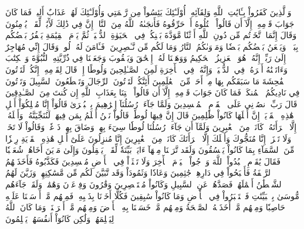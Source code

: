 وَٱلَّذِينَ كَفَرُواْ بِـَٔايَٰتِ ٱللَّهِ وَلِقَآئِهِۦٓ أُوْلَـٰٓئِكَ يَئِسُواْ مِن رَّحۡمَتِي وَأُوْلَـٰٓئِكَ لَهُمۡ عَذَابٌ أَلِيمٞ
فَمَا كَانَ جَوَابَ قَوۡمِهِۦٓ إِلَّآ أَن قَالُواْ ٱقۡتُلُوهُ أَوۡ حَرِّقُوهُ فَأَنجَىٰهُ ٱللَّهُ مِنَ ٱلنَّارِۚ إِنَّ فِي ذَٰلِكَ لَأٓيَٰتٖ لِّقَوۡمٖ يُؤۡمِنُونَ
وَقَالَ إِنَّمَا ٱتَّخَذۡتُم مِّن دُونِ ٱللَّهِ أَوۡثَٰنٗا مَّوَدَّةَ بَيۡنِكُمۡ فِي ٱلۡحَيَوٰةِ ٱلدُّنۡيَاۖ ثُمَّ يَوۡمَ ٱلۡقِيَٰمَةِ يَكۡفُرُ بَعۡضُكُم بِبَعۡضٖ وَيَلۡعَنُ بَعۡضُكُم بَعۡضٗا وَمَأۡوَىٰكُمُ ٱلنَّارُ وَمَا لَكُم مِّن نَّـٰصِرِينَ
۞فَـَٔامَنَ لَهُۥ لُوطٞۘ وَقَالَ إِنِّي مُهَاجِرٌ إِلَىٰ رَبِّيٓۖ إِنَّهُۥ هُوَ ٱلۡعَزِيزُ ٱلۡحَكِيمُ
وَوَهَبۡنَا لَهُۥٓ إِسۡحَٰقَ وَيَعۡقُوبَ وَجَعَلۡنَا فِي ذُرِّيَّتِهِ ٱلنُّبُوَّةَ وَٱلۡكِتَٰبَ وَءَاتَيۡنَٰهُ أَجۡرَهُۥ فِي ٱلدُّنۡيَاۖ وَإِنَّهُۥ فِي ٱلۡأٓخِرَةِ لَمِنَ ٱلصَّـٰلِحِينَ
وَلُوطًا إِذۡ قَالَ لِقَوۡمِهِۦٓ إِنَّكُمۡ لَتَأۡتُونَ ٱلۡفَٰحِشَةَ مَا سَبَقَكُم بِهَا مِنۡ أَحَدٖ مِّنَ ٱلۡعَٰلَمِينَ
أَئِنَّكُمۡ لَتَأۡتُونَ ٱلرِّجَالَ وَتَقۡطَعُونَ ٱلسَّبِيلَ وَتَأۡتُونَ فِي نَادِيكُمُ ٱلۡمُنكَرَۖ فَمَا كَانَ جَوَابَ قَوۡمِهِۦٓ إِلَّآ أَن قَالُواْ ٱئۡتِنَا بِعَذَابِ ٱللَّهِ إِن كُنتَ مِنَ ٱلصَّـٰدِقِينَ
قَالَ رَبِّ ٱنصُرۡنِي عَلَى ٱلۡقَوۡمِ ٱلۡمُفۡسِدِينَ
وَلَمَّا جَآءَتۡ رُسُلُنَآ إِبۡرَٰهِيمَ بِٱلۡبُشۡرَىٰ قَالُوٓاْ إِنَّا مُهۡلِكُوٓاْ أَهۡلِ هَٰذِهِ ٱلۡقَرۡيَةِۖ إِنَّ أَهۡلَهَا كَانُواْ ظَٰلِمِينَ
قَالَ إِنَّ فِيهَا لُوطٗاۚ قَالُواْ نَحۡنُ أَعۡلَمُ بِمَن فِيهَاۖ لَنُنَجِّيَنَّهُۥ وَأَهۡلَهُۥٓ إِلَّا ٱمۡرَأَتَهُۥ كَانَتۡ مِنَ ٱلۡغَٰبِرِينَ
وَلَمَّآ أَن جَآءَتۡ رُسُلُنَا لُوطٗا سِيٓءَ بِهِمۡ وَضَاقَ بِهِمۡ ذَرۡعٗاۖ وَقَالُواْ لَا تَخَفۡ وَلَا تَحۡزَنۡ إِنَّا مُنَجُّوكَ وَأَهۡلَكَ إِلَّا ٱمۡرَأَتَكَ كَانَتۡ مِنَ ٱلۡغَٰبِرِينَ
إِنَّا مُنزِلُونَ عَلَىٰٓ أَهۡلِ هَٰذِهِ ٱلۡقَرۡيَةِ رِجۡزٗا مِّنَ ٱلسَّمَآءِ بِمَا كَانُواْ يَفۡسُقُونَ
وَلَقَد تَّرَكۡنَا مِنۡهَآ ءَايَةَۢ بَيِّنَةٗ لِّقَوۡمٖ يَعۡقِلُونَ
وَإِلَىٰ مَدۡيَنَ أَخَاهُمۡ شُعَيۡبٗا فَقَالَ يَٰقَوۡمِ ٱعۡبُدُواْ ٱللَّهَ وَٱرۡجُواْ ٱلۡيَوۡمَ ٱلۡأٓخِرَ وَلَا تَعۡثَوۡاْ فِي ٱلۡأَرۡضِ مُفۡسِدِينَ
فَكَذَّبُوهُ فَأَخَذَتۡهُمُ ٱلرَّجۡفَةُ فَأَصۡبَحُواْ فِي دَارِهِمۡ جَٰثِمِينَ
وَعَادٗا وَثَمُودَاْ وَقَد تَّبَيَّنَ لَكُم مِّن مَّسَٰكِنِهِمۡۖ وَزَيَّنَ لَهُمُ ٱلشَّيۡطَٰنُ أَعۡمَٰلَهُمۡ فَصَدَّهُمۡ عَنِ ٱلسَّبِيلِ وَكَانُواْ مُسۡتَبۡصِرِينَ
وَقَٰرُونَ وَفِرۡعَوۡنَ وَهَٰمَٰنَۖ وَلَقَدۡ جَآءَهُم مُّوسَىٰ بِٱلۡبَيِّنَٰتِ فَٱسۡتَكۡبَرُواْ فِي ٱلۡأَرۡضِ وَمَا كَانُواْ سَٰبِقِينَ
فَكُلًّا أَخَذۡنَا بِذَنۢبِهِۦۖ فَمِنۡهُم مَّنۡ أَرۡسَلۡنَا عَلَيۡهِ حَاصِبٗا وَمِنۡهُم مَّنۡ أَخَذَتۡهُ ٱلصَّيۡحَةُ وَمِنۡهُم مَّنۡ خَسَفۡنَا بِهِ ٱلۡأَرۡضَ وَمِنۡهُم مَّنۡ أَغۡرَقۡنَاۚ وَمَا كَانَ ٱللَّهُ لِيَظۡلِمَهُمۡ وَلَٰكِن كَانُوٓاْ أَنفُسَهُمۡ يَظۡلِمُونَ
